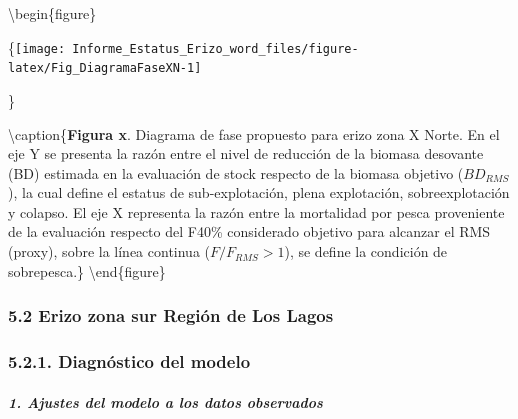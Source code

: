 \documentclass[
]{article}
\begin{document}
\textbackslash begin\{figure\}

\{\centering \texttt{[image: Informe\_Estatus\_Erizo\_word\_files/figure-latex/Fig\_DiagramaFaseXN-1]}

\}

\textbackslash caption\{\textbf{Figura x}. Diagrama de fase propuesto
para erizo zona X Norte. En el eje Y se presenta la razón entre el nivel
de reducción de la biomasa desovante (BD) estimada en la evaluación de
stock respecto de la biomasa objetivo (\(BD_{RMS}\)), la cual define el
estatus de sub-explotación, plena explotación, sobreexplotación y
colapso. El eje X representa la razón entre la mortalidad por pesca
proveniente de la evaluación respecto del F40\% considerado objetivo
para alcanzar el RMS (proxy), sobre la línea continua (\(F/F_{RMS}>1\)),
se define la condición de sobrepesca.\}\label{fig:Fig_DiagramaFaseXN}
\textbackslash end\{figure\}

\hypertarget{erizo-zona-sur-regiuxf3n-de-los-lagos}{%
\subsubsection{5.2 Erizo zona sur Región de Los
Lagos}\label{erizo-zona-sur-regiuxf3n-de-los-lagos}}

\hypertarget{diagnuxf3stico-del-modelo-2}{%
\subsubsection{5.2.1. Diagnóstico del
modelo}\label{diagnuxf3stico-del-modelo-2}}

\hypertarget{ajustes-del-modelo-a-los-datos-observados-1}{%
\subparagraph{\texorpdfstring{\textbf{\emph{1. Ajustes del modelo a los
datos
observados}}}{1. Ajustes del modelo a los datos observados}}\label{ajustes-del-modelo-a-los-datos-observados-1}}
\end{document}
